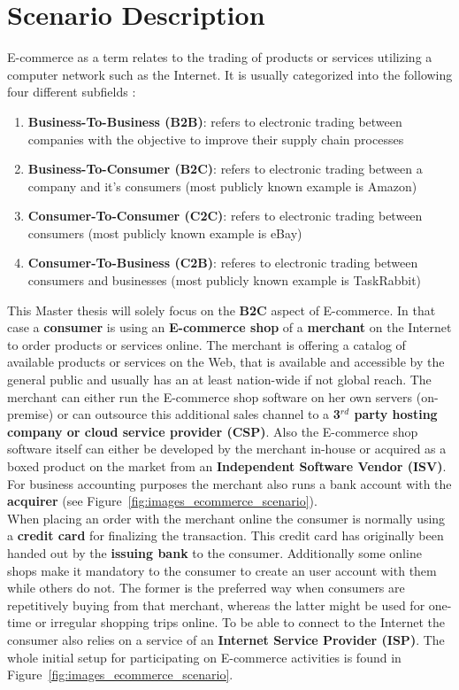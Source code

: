 
\section{Scenario Description}
\label{sec:scenario_description}

E-commerce as a term relates to the trading of products or services utilizing a computer network such as the Internet. It is usually categorized into the following four different subfields \citep{sen2015study}:\@

\begin{enumerate}
  \item \textbf{Business-To-Business (\gls{B2B})}: refers to electronic trading between companies with the objective to improve their supply chain processes
  \item \textbf{Business-To-Consumer (\gls{B2C})}: refers to electronic trading between a company and it's consumers (most publicly known example is Amazon)
  \item \textbf{Consumer-To-Consumer (\gls{C2C})}: refers to electronic trading between consumers (most publicly known example is eBay)
  \item \textbf{Consumer-To-Business (\gls{C2B})}: referes to electronic trading between consumers and businesses (most publicly known example is TaskRabbit)
\end{enumerate}

This Master thesis will solely focus on the \textbf{\gls{B2C}} aspect of E-commerce. In that case a \textbf{consumer} is using an \textbf{E-commerce shop} of a \textbf{merchant} on the Internet to order products or services online. The merchant is offering a catalog of available products or services on the Web, that is available and accessible by the general public and usually has an at least nation-wide if not global reach. The merchant can either run the E-commerce shop software on her own servers (on-premise) or can outsource this additional sales channel to a \textbf{3$^{rd}$ party hosting company or cloud service provider (\gls{CSP})}. Also the E-commerce shop software itself can either be developed by the merchant in-house or acquired as a boxed product on the market from an \textbf{Independent Software Vendor (\gls{ISV})}. For business accounting purposes the merchant also runs a bank account with the \textbf{acquirer} (see Figure~\ref{fig:images_ecommerce_scenario}). \\
When placing an order with the merchant online the consumer is normally using a \textbf{credit card} for finalizing the transaction. This credit card has originally been handed out by the \textbf{issuing bank} to the consumer. Additionally some online shops make it mandatory to the consumer to create an user account with them while others do not. The former is the preferred way when consumers are repetitively buying from that merchant, whereas the latter might be used for one-time or irregular shopping trips online. To be able to connect to the Internet the consumer also relies on a service of an \textbf{Internet Service Provider (\gls{ISP})}. The whole initial setup for participating on E-commerce activities is found in Figure~\ref{fig:images_ecommerce_scenario}.\@

